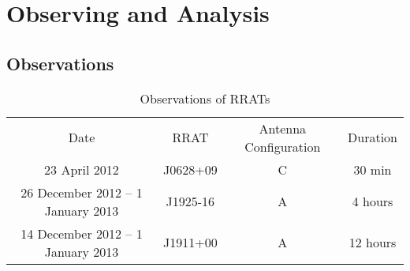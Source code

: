 \section{Observing and Analysis}

\subsection{Observations}

\begin{table} 
    \begin{tabular}{ c c c c }
        Date & RRAT & Antenna Configuration & Duration \\ 
         23 April 2012 & J0628+09 & C & 30 min \\ 
         26 December 2012 -- 1 January 2013 & J1925-16 & A & 4 hours \\ 
         14 December 2012 -- 1 January 2013 & J1911+00 & A & 12 hours \\
    \end{tabular} 
    \caption{Observations of RRATs} 
\end{table}
  